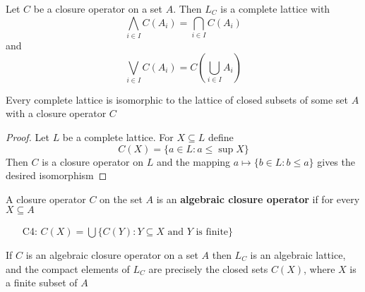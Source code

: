 \documentclass[11pt]{article}
\begin{document}
\begin{theorem}[]
Let \(C\) be a closure operator on a set \(A\). Then \(L_C\) is a complete
lattice with
\begin{equation*}
\displaystyle\bigwedge_{i\in I}C(A_i)=\bigcap_{i\in I}C(A_i)
\end{equation*}
and 
\begin{equation*}
\displaystyle\bigvee_{i\in I}C(A_i)=C(\bigcup_{i\in I}A_i)
\end{equation*}
\end{theorem}


\begin{theorem}[]
Every complete lattice is isomorphic to the lattice of closed subsets of some
set \(A\) with a closure operator \(C\)
\end{theorem}

\begin{proof}
Let \(L\) be a complete lattice. For \(X\subseteq L\) define
\begin{equation*}
C(X)=\{a\in L:a\le\sup X\}
\end{equation*}
Then \(C\) is a closure operator on \(L\) and the mapping 
\(a\mapsto\{b\in L:b\le a\}\) gives the desired isomorphism
\end{proof}

\begin{definition}[]
A closure operator \(C\) on the set \(A\) is an \textbf{algebraic closure operator} if for
every \(X\subseteq A\)
\begin{itemize}
\item[C4:] \(C(X)=\bigcup\{C(Y):Y\subseteq X\text{ and } Y\text{ is finite}\}\)
\end{itemize}
\end{definition}

\begin{theorem}[]
If \(C\) is an algebraic closure operator on a set \(A\) then \(L_C\) is an
algebraic lattice, and the compact elements of \(L_C\) are precisely the closed
sets \(C(X)\), where \(X\) is a finite subset of \(A\)
\end{theorem}
\end{document}
